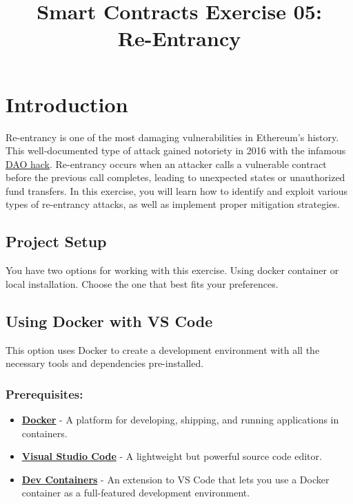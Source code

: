 \documentclass[12pt]{article}
\title{Smart Contracts Exercise 05: \\ Re-Entrancy}
\author{}
\date{}
\begin{document}
\maketitle
\section{Introduction}

Re-entrancy is one of the most damaging vulnerabilities in Ethereum's history. This well-documented type of attack gained notoriety in 2016 with the infamous \href{https://en.wikipedia.org/wiki/The_DAO}{DAO hack}. Re-entrancy occurs when an attacker calls a vulnerable contract before the previous call completes, leading to unexpected states or unauthorized fund transfers. In this exercise, you will learn how to identify and exploit various types of re-entrancy attacks, as well as implement proper mitigation strategies.

\subsection*{Project Setup}

You have two options for working with this exercise. Using docker container or local installation. Choose the one that best fits your preferences.

\subsection{Using Docker with VS Code}

This option uses Docker to create a development environment with all the necessary tools and dependencies pre-installed.

\subsubsection*{Prerequisites:}

\begin{itemize}
    \item \textbf{\href{https://www.docker.com/products/docker-desktop}{Docker}} - A platform for developing, shipping, and running applications in containers.
    \item \textbf{\href{https://code.visualstudio.com/}{Visual Studio Code}} - A lightweight but powerful source code editor.
    \item \textbf{\href{https://marketplace.visualstudio.com/items?itemName=ms-vscode-remote.remote-containers}{Dev Containers}} - An extension to VS Code that lets you use a Docker container as a full-featured development environment.
\end{itemize}
\end{document}
